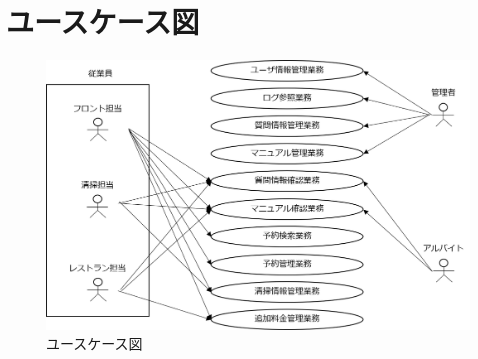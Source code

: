 
\section{ユースケース図}\label{sec:usecase}
\begin{figure}[H]
 \centering
   \includegraphics[width=150mm]{fib/usecase_v2.png}
 \caption{ユースケース図}
    \label{fig:usecase}
\end{figure}

